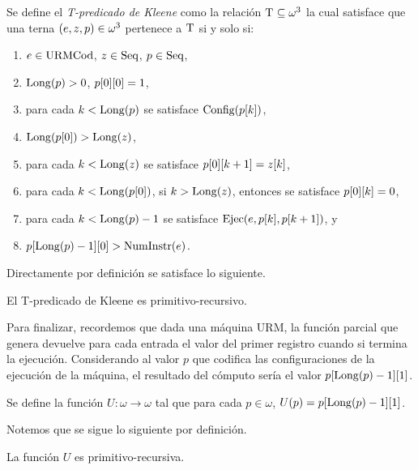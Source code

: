 \begin{definition}
	\label{def: t_predicado_de_kleene}
	Se define el \emph{T-predicado de Kleene} como la relación $\KLEENE\subseteq\omega^{3}$ la cual satisface que una terna $\pa*{e, z, p}\in\omega^{3}$ pertenece a $\KLEENE$ si y solo si:

	\begin{enumerate}
		\item $e\in\URMCODIGO$, $z\in\SECUENCIAS$, $p\in\SECUENCIAS$,
		\item $\LONGITUD\pa*{p} > 0$, $p\bra*{0}\bra*{0} = 1$,
		\item para cada $k <\LONGITUD\pa*{p}$ se satisface $\CONFIGURACIONES\pa*{p\bra*{k}}$,
		\item $\LONGITUD\pa*{p\bra*{0}} >\LONGITUD\pa*{z}$,
		\item para cada $k <\LONGITUD\pa*{z}$ se satisface $p\bra*{0}\bra*{k + 1} = z\bra*{k}$,
		\item para cada $k <\LONGITUD\pa*{p\bra*{0}}$, si $k >\LONGITUD\pa*{z}$, entonces se satisface $p\bra*{0}\bra*{k} = 0$,
		\item para cada $k <\LONGITUD\pa*{p} - 1$ se satisface $\EJECUCION\pa*{e, p\bra*{k}, p\bra*{k + 1}}$, y
		\item $p\bra*{\LONGITUD\pa*{p} - 1}\bra*{0} >\NUMINSTRUCCIONES\pa*{e}$.
	\end{enumerate}
\end{definition}

Directamente por definición se satisface lo siguiente.

\begin{theorem}
	El T-predicado de Kleene es primitivo-recursivo.
\end{theorem}

Para finalizar, recordemos que dada una máquina URM, la función parcial que genera devuelve para cada entrada el valor del primer registro cuando si termina la ejecución. Considerando al valor $p$ que codifica las configuraciones de la ejecución de la máquina, el resultado del cómputo sería el valor $p\bra*{\LONGITUD\pa*{p} - 1}\bra*{1}$.

\begin{definition}[Función $U$]
	Se define la función $U:\omega\to\omega$ tal que para cada $p\in\omega$, $U(p) = p\bra*{\LONGITUD\pa*{p} - 1}\bra*{1}$.
\end{definition}

Notemos que se sigue lo siguiente por definición.

\begin{theorem}
	La función $U$ es primitivo-recursiva.
\end{theorem}

